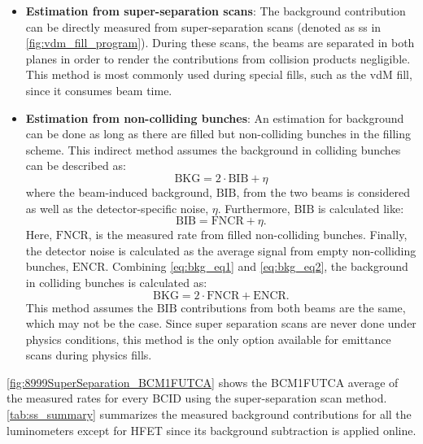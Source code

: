 \begin{itemize}
	\item \textbf{Estimation from super-separation scans}: The background contribution can be directly measured from super-separation scans (denoted as ss in \autoref{fig:vdm_fill_program}). During these scans, the beams are separated in both planes in order to render the contributions from collision products negligible. This method is most commonly used during special fills, such as the vdM fill, since it consumes beam time.
	\item \textbf{Estimation from non-colliding bunches}: An estimation for background can be done as long as there are filled but non-colliding bunches in the filling scheme. This indirect method assumes the background in colliding bunches can be described as:
	\begin{equation}
		\label{eq:bkg_eq1}
		\mathrm{BKG} = 2 \cdot \mathrm{BIB} + \eta
	\end{equation}
	where the beam-induced background, $\mathrm{BIB}$, from the two beams is considered as well as the detector-specific noise, $\eta$. Furthermore, $\mathrm{BIB}$ is calculated like:
	\begin{equation}
		\label{eq:bkg_eq2}
		\mathrm{BIB} = \mathrm{FNCR} + \eta.
	\end{equation}
	Here, $\mathrm{FNCR}$, is the measured rate from filled non-colliding bunches. Finally, the detector noise is calculated as the average signal from empty non-colliding bunches, $\mathrm{ENCR}$. Combining \autoref{eq:bkg_eq1} and \autoref{eq:bkg_eq2}, the background in colliding bunches is calculated as:
	\begin{equation}
		\mathrm{BKG} = 2 \cdot \mathrm{FNCR} + \mathrm{ENCR}.
	\end{equation}
	This method assumes the $\mathrm{BIB}$ contributions from both beams are the same, which may not be the case. Since super separation scans are never done under physics conditions, this method is the only option available for emittance scans during physics fills.
\end{itemize}

\autoref{fig:8999SuperSeparation_BCM1FUTCA} shows the BCM1FUTCA average of the measured rates for every BCID using the super-separation scan method. \autoref{tab:ss_summary} summarizes the measured background contributions for all the luminometers except for HFET since its background subtraction is applied online.

